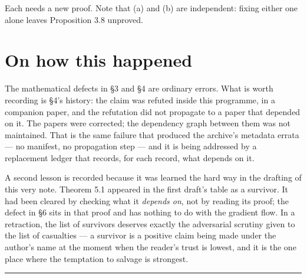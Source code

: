 \documentclass[11pt]{article}
\begin{document}
\noindent
Each needs a new proof. Note that (a) and (b) are independent: fixing either one alone
leaves Proposition 3.8 unproved.

\section{On how this happened}

The mathematical defects in \S3 and \S4 are ordinary errors. What is worth recording
is \S4's history: the claim was refuted inside this programme, in a companion paper,
and the refutation did not propagate to a paper that depended on it. The papers were
corrected; the dependency graph between them was not maintained. That is the same
failure that produced the archive's metadata errata --- no manifest, no propagation
step --- and it is being addressed by a replacement ledger that records, for each
record, what depends on it.

A second lesson is recorded because it was learned the hard way in the drafting of
this very note. Theorem 5.1 appeared in the first draft's table as a survivor. It had
been cleared by checking what it \emph{depends on}, not by reading its proof; the
defect in \S6 sits in that proof and has nothing to do with the gradient flow. In a
retraction, the list of survivors deserves exactly the adversarial scrutiny given to
the list of casualties --- a survivor is a positive claim being made under the
author's name at the moment when the reader's trust is lowest, and it is the one place
where the temptation to salvage is strongest.

\vspace{4pt}
\noindent\rule{\textwidth}{0.8pt}
\end{document}
